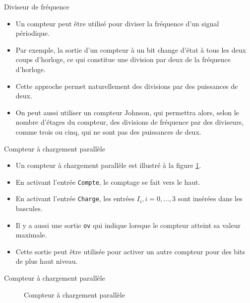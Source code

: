 \documentclass[presentation]{beamer}
\begin{document}
\begin{frame}[label={sec:org6be264f}]{Diviseur de fréquence}
\begin{itemize}
\item Un compteur peut être utilisé pour diviser la fréquence d'un signal périodique.

\item Par exemple, la sortie d'un compteur à un bit change d'état à tous les deux coups d'horloge, ce qui constitue une division par deux de la fréquence d'horloge.

\item Cette approche permet naturellement des divisions par des puissances de deux.

\item On peut aussi utiliser un compteur Johnson, qui permettra alors, selon le nombre d'étages du compteur, des divisions de fréquence par des diviseurs, comme trois ou cinq, qui ne sont pas des puissances de deux.
\end{itemize}
\end{frame}

\begin{frame}[label={sec:org32b67fe},fragile]{Compteur à chargement parallèle}
 \begin{itemize}
\item Un compteur à chargement parallèle est illustré à la figure \ref{fig:org03c0b27}.

\item En activant l'entrée \texttt{Compte}, le comptage se fait vers le haut.

\item En activant l'entrée \texttt{Charge}, les entrées \(I_i, i=0, \ldots, 3\) sont insérées dans les bascules.

\item Il y a aussi une sortie \texttt{ov} qui indique lorsque le compteur atteint sa valeur maximale.

\item Cette sortie peut être utilisée pour activer un autre compteur pour des bits de plus haut niveau.
\end{itemize}
\end{frame}


\begin{frame}[label={sec:org9d06d51}]{Compteur à chargement parallèle}
\begin{figure}[htbp]
\centering

\caption{\label{fig:org03c0b27}Compteur à chargement parallèle}
\end{figure}
\end{frame}
\end{document}
